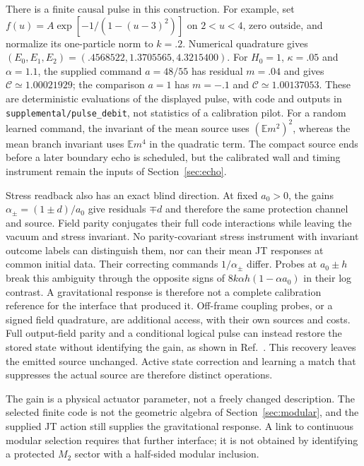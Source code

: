 There is a finite causal pulse in this construction. For example, set
$f(u)=A\exp[-1/(1-(u-3)^2)]$ on $2<u<4$, zero outside, and normalize
its one-particle norm to $k=.2$. Numerical quadrature gives
$(E_0,E_1,E_2)=(.4568522,1.3705565,4.3215400)$.
For $H_0=1$, $\kappa=.05$ and $\alpha=1.1$, the supplied command
$a=48/55$ has residual $m=.04$ and gives
$\mathcal C\simeq1.00021929$; the comparison $a=1$
has $m=-.1$ and $\mathcal C\simeq1.00137053$.
These are deterministic evaluations of the displayed pulse, with code
and outputs in \texttt{supplemental/pulse\_debit}, not statistics of
a calibration pilot. For a random learned command,
the invariant of the mean source uses $(\mathbb E m^2)^2$, whereas
the mean branch invariant uses $\mathbb E m^4$ in the quadratic term. The compact source ends before a later boundary echo is
scheduled, but the calibrated wall and timing instrument remain the
inputs of Section~\ref{sec:echo}.

Stress readback also has an exact blind direction. At fixed $a_0>0$,
the gains $\alpha_\pm=(1\pm d)/a_0$ give residuals $\mp d$ and therefore
the same protection channel and source. Field parity conjugates their
full code interactions while leaving the vacuum and stress invariant.
No parity-covariant stress instrument with invariant outcome labels can
distinguish them, nor can their mean JT responses at common initial data.
Their correcting commands $1/\alpha_\pm$ differ. Probes at $a_0\pm h$
break this ambiguity through the opposite signs of
$8k\alpha h(1-\alpha a_0)$ in their log contrast. A gravitational
response is therefore not a complete calibration reference for the
interface that produced it. Off-frame coupling probes, or a signed
field quadrature, are additional access, with their own sources and costs.
Full output-field parity and a conditional logical pulse can instead
restore the stored state without identifying the gain, as shown in
Ref.~\cite{BrainAnchor}. This recovery leaves the emitted source
unchanged. Active state correction and learning a match that suppresses
the actual source are therefore distinct operations.

The gain is a physical actuator parameter, not a freely changed
description. The selected finite code is not the geometric algebra of
Section~\ref{sec:modular}, and the supplied JT action still supplies the
gravitational response. A link to continuous modular selection requires
that further interface; it is not obtained by identifying a protected
$M_2$ sector with a half-sided modular inclusion.


